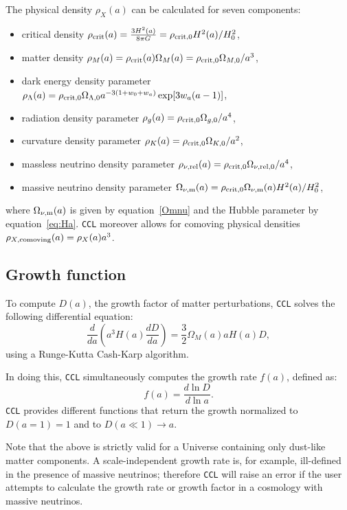 \documentclass[\docopts]{\docclass}
\newcommand{\ccl}{{\tt CCL}\xspace}
\begin{document}
The physical density $\rho_X(a)$ can be calculated for seven components:
\begin{itemize}
\item critical density $\rho_{\rm crit}(a) = {{3 H^2(a)} \over { 8 \pi G}} = \rho_{\rm crit,0} H^2(a) / H_0^2$,
\item matter density $\rho_M(a) = \rho_{\rm crit}(a) \Omega_M(a) = \rho_{\rm crit,0} \Omega_{M,0} / a^{3}$,
\item dark energy density parameter $\rho_\Lambda(a) = \rho_{\rm crit,0} \Omega_{\Lambda,0} a^{-3(1+w_0+w_a)} \exp[3 w_a (a-1)]$,
\item radiation density parameter $\rho_g(a) = \rho_{\rm crit,0} \Omega_{g,0} / a^{4}$,
\item curvature density parameter $\rho_K(a) = \rho_{\rm crit,0} \Omega_{K,0} / a^{2}$,
\item massless neutrino density parameter $\rho_{\nu, {\rm rel}}(a) = \rho_{\rm crit,0} \Omega_{\nu, {\rm rel},0} / a^{4}$,
\item massive neutrino density parameter $\Omega_{\nu, {\rm m}}(a) = \rho_{\rm crit,0} \Omega_{\nu, {\rm m}}(a) H^2(a) / H_0^2$,
\end{itemize}
where $\Omega_{\nu, {\rm m}}(a)$ is given by equation~\ref{Omnu} and the Hubble
parameter by equation~\ref{eq:Ha}. \ccl moreover allows for comoving physical
densities $\rho_{X, {\rm comoving}}(a) = \rho_X(a) a^3$.


\subsection{Growth function}
\label{sec:growth}

To compute $D(a)$, the growth factor of matter perturbations, \ccl solves the
following differential equation:
\begin{equation}
  \frac{d}{da}\left(a^3H(a)\frac{dD}{da}\right)=\frac{3}{2}\Omega_M(a)aH(a)D,
\end{equation}
using a Runge-Kutta Cash-Karp algorithm.

In doing this, \ccl simultaneously computes the growth rate $f(a)$, defined as:
\begin{equation}
  f(a)=\frac{d\ln D}{d\ln a}.
\end{equation}
\ccl provides different functions that return the growth
normalized to $D(a=1)=1$ and to $D(a\ll1)\rightarrow a$.

Note that the above is strictly valid for a Universe containing only dust-like
matter components. A scale-independent growth rate is, for example, ill-defined
in the presence of massive neutrinos; therefore \ccl will raise an error if the
user attempts to calculate the growth rate or growth factor in a cosmology
with massive neutrinos.
\end{document}
